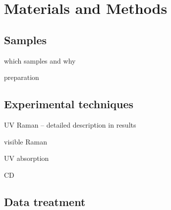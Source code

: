 \chapter{Materials and Methods}

\section{Samples}

\begin{docitemize}
	\item which samples and why
	\item preparation
\end{docitemize}

\section{Experimental techniques}

\begin{docitemize}
	\item UV Raman -- detailed description in results
	\item visible Raman
	\item UV absorption
	\item CD
\end{docitemize}

\section{Data treatment}
